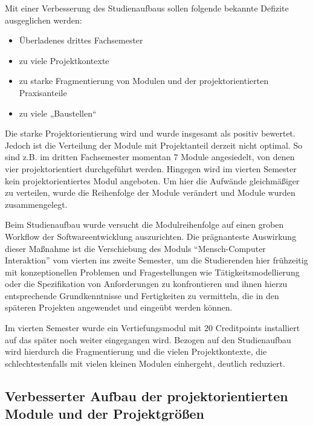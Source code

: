 Mit einer Verbesserung des Studienaufbaus sollen folgende bekannte
Defizite ausgeglichen werden:

\begin{itemize}
\tightlist
\item
  Überladenes drittes Fachsemester
\item
  zu viele Projektkontexte
\item
  zu starke Fragmentierung von Modulen und der projektorientierten
  Praxisanteile
\item
  zu viele „Baustellen``
\end{itemize}

Die starke Projektorientierung wird und wurde insgesamt als positiv
bewertet. Jedoch ist die Verteilung der Module mit Projektanteil derzeit
nicht optimal. So sind z.B. im dritten Fachsemester momentan 7 Module
angesiedelt, von denen vier projektorientiert durchgeführt werden.
Hingegen wird im vierten Semester kein projektorientiertes Modul
angeboten. Um hier die Aufwände gleichmäßiger zu verteilen, wurde die
Reihenfolge der Module verändert und Module wurden zusammengelegt.

Beim Studienaufbau wurde versucht die Modulreihenfolge auf einen groben
Workflow der Softwareentwicklung auszurichten. Die prägnanteste
Auswirkung dieser Maßnahme ist die Verschiebung des Moduls
``Mensch-Computer Interaktion'' vom vierten ins zweite Semester, um die
Studierenden hier frühzeitig mit konzeptionellen Problemen und
Fragestellungen wie Tätigkeitsmodellierung oder die Spezifikation von
Anforderungen zu konfrontieren und ihnen hierzu entsprechende
Grundkenntnisse und Fertigkeiten zu vermitteln, die in den späteren
Projekten angewendet und eingeübt werden können.

Im vierten Semester wurde ein Vertiefungsmodul mit 20 Creditpoints
installiert auf das später noch weiter eingegangen wird. Bezogen auf den
Studienaufbau wird hierdurch die Fragmentierung und die vielen
Projektkontexte, die schlechtestenfalls mit vielen kleinen Modulen
einhergeht, deutlich reduziert.

\subsection{Verbesserter Aufbau der projektorientierten Module und
der
Projektgrößen\label{/mi-2017/selbstbericht/0150-soll-zustand-geplante-veraenderungen/0000-geplante-veraenderungen-bachelor}}\label{verbesserter-aufbau-der-projektorientierten-module-und-der-projektgruxf6uxdfenpathlabelmi-2017selbstbericht0150-soll-zustand-geplante-veraenderungen0000-geplante-veraenderungen-bachelor}

